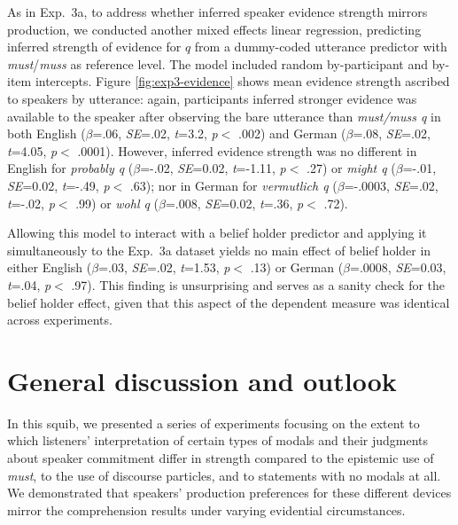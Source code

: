 \documentclass[11pt]{article}
\newcommand{\figref}[1]{Figure \ref{#1}}
\begin{document}
As in Exp.~3a, to address whether inferred speaker evidence strength mirrors production, we conducted another mixed effects linear regression, predicting inferred strength of evidence for $q$ from a dummy-coded utterance predictor with \emph{must}/\emph{muss} as reference level. The model included random by-participant and by-item intercepts.  \figref{fig:exp3-evidence} shows mean evidence strength ascribed to speakers by utterance:  again, participants inferred stronger evidence was available to the speaker after observing the bare utterance than \emph{must/muss q} in both English ($\beta$=.06, \emph{SE}=.02, \emph{t}=3.2, \emph{p}$<$ .002) and German ($\beta$=.08, \emph{SE}=.02, \emph{t}=4.05, \emph{p}$<$ .0001). However, inferred evidence strength was no different in English for \emph{probably q} ($\beta$=-.02, \emph{SE}=0.02, \emph{t}=-1.11, \emph{p}$<$ .27) or \emph{might q} ($\beta$=-.01, \emph{SE}=0.02, \emph{t}=-.49, \emph{p}$<$ .63); nor in German for \emph{vermutlich q} ($\beta$=-.0003, \emph{SE}=.02, \emph{t}=-.02, \emph{p}$<$ .99) or \emph{wohl q} ($\beta$=.008, \emph{SE}=0.02, \emph{t}=.36, \emph{p}$<$ .72).

Allowing this model to interact with a belief holder predictor and applying it simultaneously to the Exp.~3a dataset yields no main effect of belief holder in either English ($\beta$=.03, \emph{SE}=.02, \emph{t}=1.53, \emph{p}$<$ .13) or German ($\beta$=.0008, \emph{SE}=0.03, \emph{t}=.04, \emph{p}$<$ .97). This finding is unsurprising and serves as a sanity check for the belief holder effect, given that this aspect of the dependent measure was identical across experiments.


\section{General discussion and outlook}

In this squib, we presented a series of experiments focusing on the extent to which listeners' interpretation of certain types of modals and their judgments about speaker commitment differ in strength compared to the epistemic use of \emph{must}, to the use of discourse particles, and to statements with no modals at all. We demonstrated that speakers' production preferences for these different devices mirror the comprehension results under varying evidential circumstances.
\end{document}
